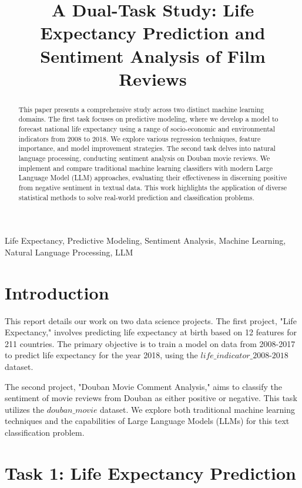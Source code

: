 \documentclass{article}
\title{A Dual-Task Study: Life Expectancy Prediction and Sentiment Analysis of Film Reviews}
\begin{document}
%
\maketitle
%
\begin{abstract}
This paper presents a comprehensive study across two distinct machine learning domains. The first task focuses on predictive modeling, where we develop a model to forecast national life expectancy using a range of socio-economic and environmental indicators from 2008 to 2018. We explore various regression techniques, feature importance, and model improvement strategies. The second task delves into natural language processing, conducting sentiment analysis on Douban movie reviews. We implement and compare traditional machine learning classifiers with modern Large Language Model (LLM) approaches, evaluating their effectiveness in discerning positive from negative sentiment in textual data. This work highlights the application of diverse statistical methods to solve real-world prediction and classification problems.
\end{abstract}
%
\begin{keywords}
Life Expectancy, Predictive Modeling, Sentiment Analysis, Machine Learning, Natural Language Processing, LLM
\end{keywords}
%
\section{Introduction}
\label{sec:intro}

This report details our work on two data science projects. 
The first project, "Life Expectancy," involves predicting life expectancy at birth based on 12 features for 211 countries. 
The primary objective is to train a model on data from 2008-2017 to predict life expectancy for the year 2018, 
using the $\textit{life\_indicator\_2008-2018}$ dataset.

The second project, "Douban Movie Comment Analysis," aims to classify the sentiment of movie reviews from Douban as either positive or negative. This task utilizes the $\textit{douban\_movie}$ dataset. We explore both traditional machine learning techniques and the capabilities of Large Language Models (LLMs) for this text classification problem.

\section{Task 1: Life Expectancy Prediction}
\label{sec:task1}
\end{document}
